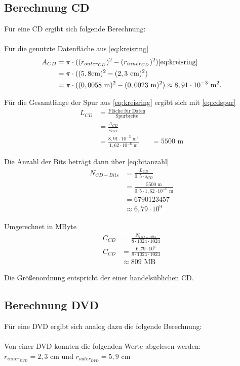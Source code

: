 \documentclass[9pt,twocolumn,twoside]{pnas-new}
\begin{document}
\subsection{Berechnung CD}
Für eine CD ergibt sich folgende Berechnung: \\ \\
Für die genutzte Datenfläche aus \eqref{eq:kreisring}
\begin{align*}
 A_{CD} &= \pi\cdot((r_{outer_{CD}})^2-(r_{inner_{CD}})^2)  \ref{eq:kreisring}\\	
&= \pi\cdot((5,8\mbox{cm})^2-(2,3\mbox{ cm})^2) \\
 &=  \pi\cdot((0,0058\mbox{ m})^2-(0,0023\mbox{ m})^2) \approx  8,91\cdot10^{-3}\mbox{ m}^2.
\end{align*}

Für die Gesamtlänge der Spur aus \ref{eq:kreisring} ergibt sich mit \eqref{eq:cdspur}
\begin{align*}
 L_{CD} &= \frac{\mbox{Fläche für Daten}}{\mbox{Spurbreite}}\\
 &= \frac{A_{CD}}{s_{CD}}\\
 &= \frac{8,91\cdot10^{-3}\mbox{ m}^2}{1,62\cdot10^{-6}\mbox{ m} }
 &= 5500\mbox{ m}
\end{align*}

Die Anzahl der Bits beträgt dann über \eqref{eq:bitanzahl}
\begin{align*}
N_{CD-Bits} &=  \frac{L_{CD}}{0,5\cdot s_{CD}}\\
&= \frac{5500\mbox{ m}}{0,5 \cdot 1,62 \cdot 10^{-6}\mbox{ m}}\\
&= 6790123457 \\
&\approx 6,79 \cdot 10^9
\end{align*}

Umgerechnet in MByte
\begin{align*}
C_{CD} &= \frac{N_{CD-Bits}}{8\cdot1024\cdot1024}\\
C_{CD} &= \frac{ 6,79\cdot10^9}{8\cdot1024\cdot1024}\\
&\approx 809\mbox{ MB}
\end{align*}

Die Größenordnung entspricht der einer handelsüblichen CD.

\subsection{Berechnung DVD}
Für eine DVD ergibt sich analog dazu die folgende Berechnung: \\ \\
Von einer DVD konnten die folgenden Werte abgelesen werden: \begin{math} r_{inner_{DVD}} = 2,3 \mbox{ cm und } r_{outer_{DVD}} = 5,9 \mbox{ cm} \end{math} \\
\end{document}
